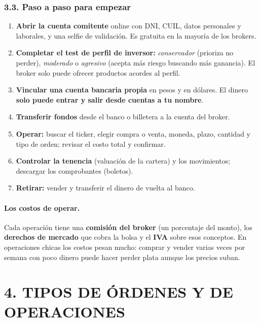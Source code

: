 \subsubsection*{3.3. Paso a paso para empezar}
\begin{enumerate}
  \item \textbf{Abrir la cuenta comitente} online con DNI, CUIL, datos personales y
        laborales, y una selfie de validación. Es gratuita en la mayoría de los brokers.
  \item \textbf{Completar el test de perfil de inversor:} \textit{conservador} (prioriza no
        perder), \textit{moderado} o \textit{agresivo} (acepta más riesgo buscando más
        ganancia). El broker solo puede ofrecer productos acordes al perfil.
  \item \textbf{Vincular una cuenta bancaria propia} en pesos y en dólares. El dinero
        \textbf{solo puede entrar y salir desde cuentas a tu nombre}.
  \item \textbf{Transferir fondos} desde el banco o billetera a la cuenta del broker.
  \item \textbf{Operar:} buscar el ticker, elegir compra o venta, moneda, plazo, cantidad y
        tipo de orden; revisar el costo total y confirmar.
  \item \textbf{Controlar la tenencia} (valuación de la cartera) y los movimientos; descargar
        los comprobantes (boletos).
  \item \textbf{Retirar:} vender y transferir el dinero de vuelta al banco.
\end{enumerate}

\paragraph*{Los costos de operar.}
Cada operación tiene una \textbf{comisión del broker} (un porcentaje del monto), los
\textbf{derechos de mercado} que cobra la bolsa y el \textbf{IVA} sobre esos conceptos. En
operaciones chicas los costos pesan mucho: comprar y vender varias veces por semana con poco
dinero puede hacer perder plata aunque los precios suban.

\section*{4. TIPOS DE ÓRDENES Y DE OPERACIONES}

